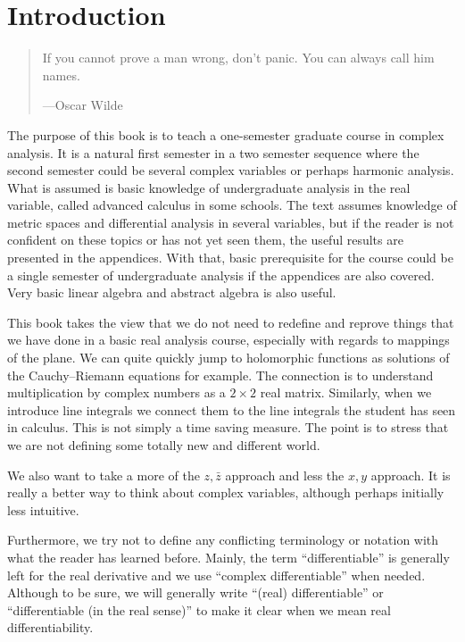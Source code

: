 \documentclass[12pt,openany]{book}
\theoremstyle{plain}
\theoremstyle{remark}
\theoremstyle{definition}
\newenvironment{myquote}{%
    \begin{quote}%
    \begingroup\itshape
}{%
    \endgroup%
    \end{quote}
}
\theoremstyle{exercise}
\theoremstyle{example}
\begin{document}
\chapter*{Introduction} \label{ch:intro}

\begin{myquote}
If you cannot prove a man wrong, don't panic. You can always call him names.

---Oscar Wilde 
\end{myquote}

The purpose of this book is to teach a one-semester graduate course in
complex analysis.
It is a natural first semester in a two semester sequence where the second
semester could be several complex variables or perhaps harmonic analysis.
What is assumed is basic knowledge of undergraduate
analysis in the real variable, called advanced calculus in some schools.
The text assumes knowledge of metric spaces
and differential analysis in several variables, but if the reader is not
confident on these topics or has not yet seen them, the useful results
are presented in the appendices.  With that, basic prerequisite for the
course could be a single semester of undergraduate analysis if the
appendices are also covered.  Very basic linear algebra and abstract algebra
is also useful.

This book takes the view that we do not need to redefine and reprove
things that we have done in a basic real analysis course, especially with
regards to mappings of the plane.  We can quite quickly jump to
holomorphic functions as solutions of the Cauchy--Riemann equations for
example.
The connection is to understand multiplication by complex numbers
as a $2 \times 2$ real matrix.
Similarly, when we introduce line integrals we connect
them to the line integrals the student has seen in calculus.
This is not simply a time saving measure.
The point is to stress that we are not defining some totally new and different world.

We also want to take a more of the $z,\bar{z}$ approach and less the
$x,y$ approach.  It is really a better way to think about complex variables,
although perhaps initially less intuitive.

Furthermore, we try not to define any conflicting terminology or notation
with what the reader has learned before.
Mainly, the term ``differentiable'' is generally left for the real
derivative and we use ``complex differentiable'' when needed.  Although
to be sure, 
we will generally write ``(real) differentiable'' or
``differentiable (in the real sense)'' to
make it clear when we mean real differentiability.
\end{document}
